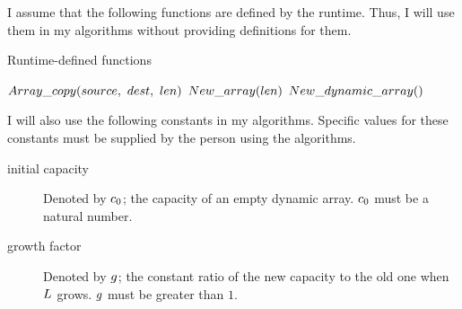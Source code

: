 I assume that the following functions are defined by the runtime. Thus, I will use them in my algorithms without providing definitions for them.

\begin{algorithm}[H]
	\caption{Runtime-defined functions}
	\begin{algorithmic}
		\State $\FuncArrayCopy(source,\ dest,\ len)$
		\State
		\State $New\_array(len)$
		\State
		\State $New\_dynamic\_array()$
	\end{algorithmic}
\end{algorithm}

I will also use the following constants in my algorithms. Specific values for these constants must be supplied by the person using the algorithms.

\begin{description}
	\item[initial capacity] Denoted by $c_0$; the capacity of an empty dynamic array. $c_0$ must be a natural number.
	\item[growth factor] Denoted by $g$; the constant ratio of the new capacity to the old one when $L$ grows. $g$ must be greater than $1$.
\end{description}